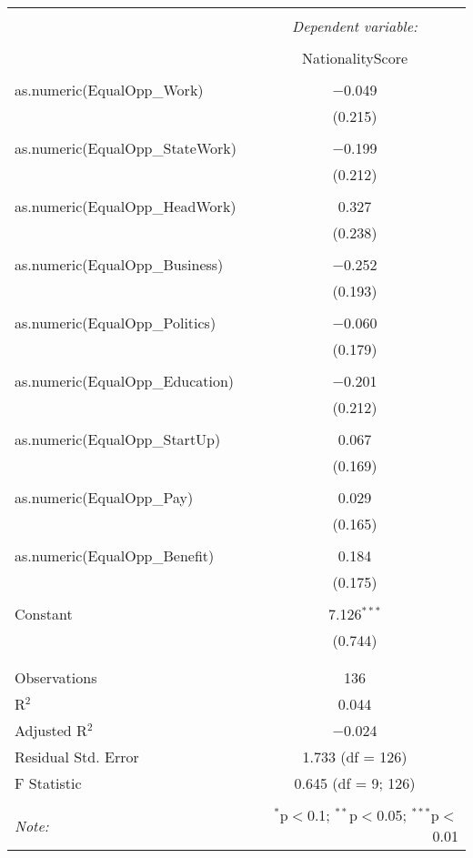 \documentclass{article}
\begin{document}
\begin{table}[!htbp] \centering 
  \caption{} 
  \label{} 
\begin{tabular}{@{\extracolsep{5pt}}lc} 
\\[-1.8ex]\hline 
\hline \\[-1.8ex] 
 & \multicolumn{1}{c}{\textit{Dependent variable:}} \\ 
\cline{2-2} 
\\[-1.8ex] & NationalityScore \\ 
\hline \\[-1.8ex] 
 as.numeric(EqualOpp\_Work) & $-$0.049 \\ 
  & (0.215) \\ 
  & \\ 
 as.numeric(EqualOpp\_StateWork) & $-$0.199 \\ 
  & (0.212) \\ 
  & \\ 
 as.numeric(EqualOpp\_HeadWork) & 0.327 \\ 
  & (0.238) \\ 
  & \\ 
 as.numeric(EqualOpp\_Business) & $-$0.252 \\ 
  & (0.193) \\ 
  & \\ 
 as.numeric(EqualOpp\_Politics) & $-$0.060 \\ 
  & (0.179) \\ 
  & \\ 
 as.numeric(EqualOpp\_Education) & $-$0.201 \\ 
  & (0.212) \\ 
  & \\ 
 as.numeric(EqualOpp\_StartUp) & 0.067 \\ 
  & (0.169) \\ 
  & \\ 
 as.numeric(EqualOpp\_Pay) & 0.029 \\ 
  & (0.165) \\ 
  & \\ 
 as.numeric(EqualOpp\_Benefit) & 0.184 \\ 
  & (0.175) \\ 
  & \\ 
 Constant & 7.126$^{***}$ \\ 
  & (0.744) \\ 
  & \\ 
\hline \\[-1.8ex] 
Observations & 136 \\ 
R$^{2}$ & 0.044 \\ 
Adjusted R$^{2}$ & $-$0.024 \\ 
Residual Std. Error & 1.733 (df = 126) \\ 
F Statistic & 0.645 (df = 9; 126) \\ 
\hline 
\hline \\[-1.8ex] 
\textit{Note:}  & \multicolumn{1}{r}{$^{*}$p$<$0.1; $^{**}$p$<$0.05; $^{***}$p$<$0.01} \\ 
\end{tabular} 
\end{table} 
\end{document}
